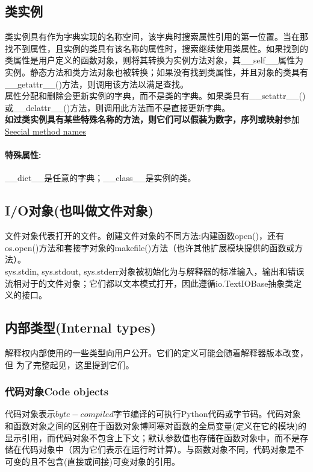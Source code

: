 \documentclass[10pt,UTF8]{ctexart}
\begin{document}
\begin{flushleft}
\subsection{类实例}
类实例具有作为字典实现的名称空间，该字典时搜索属性引用的第一位置。当在那找不到属性，且实例的类具有该名称的属性时，搜索继续使用类属性。如果找到的类属性是用户定义的函数对象，则将其转换为实例方法对象，其__self__属性为实例。静态方法和类方法对象也被转换；如果没有找到类属性，并且对象的类具有__getattr__()方法，则调用该方法以满足查找。\\
\indent 属性分配和删除会更新实例的字典，而不是类的字典。如果类具有__setattr__()或__delattr__()方法，则调用此方法而不是直接更新字典。\\
\indent \textbf{如过类实例具有某些特殊名称的方法，则它们可以假装为数字，序列或映射}参加\href{https://docs.python.org/3/reference/datamodel.html#specialnames}{Seecial method names}\\
\paragraph{特殊属性:}__dict__是任意的字典；__class__是实例的类。
\subsection{I/O对象(也叫做文件对象)}
文件对象代表打开的文件。创建文件对象的不同方法:内建函数open()，还有os.open()方法和套接字对象的makefile()方法（也许其他扩展模块提供的函数或方法）。\\
\indent sys.stdin, sys.stdout, sys.stderr对象被初始化为与解释器的标准输入，输出和错误流相对于的文件对象；它们都以文本模式打开，因此遵循io.TextIOBase抽象类定义的接口。
\subsection{内部类型(Internal types)}
解释权内部使用的一些类型向用户公开。它们的定义可能会随着解释器版本改变，但 为了完整起见，这里提到它们。
\subsubsection{代码对象Code objects}
代码对象表示$byte-compiled$字节编译的可执行Python代码或字节码。代码对象和函数对象之间的区别在于函数对象博阿寒对函数的全局变量(定义在它的模块)的显示引用，而代码对象不包含上下文；默认参数值也存储在函数对象中，而不是存储在代码对象中（因为它们表示在运行时计算）。与函数对象不同，代码对象是不可变的且不包含(直接或间接)可变对象的引用。

\end{flushleft}
\end{document}
